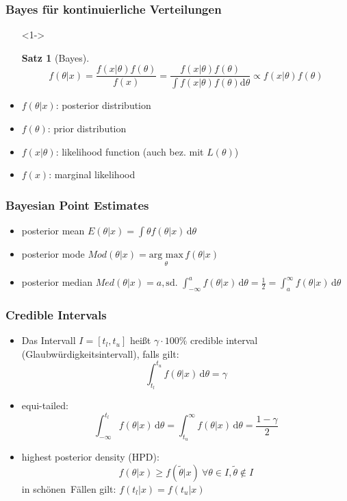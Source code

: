 \documentclass[aspectratio=169,xcolor=dvipsnames]{beamer}
\newtheorem{satz}{Satz}
\begin{document}
\begin{frame}
\frametitle{Bayes für kontinuierliche Verteilungen}
\begin{itemize}
\item[]<1-> \begin{satz}[Bayes]
$$f(\theta|x)=\frac{f(x|\theta)f(\theta)}{f(x)}=\frac{f(x|\theta)f(\theta)}{\int f(x|\theta)f(\theta)\text{d}\theta}\propto f(x|\theta)f(\theta)$$
\end{satz}
\item<2-> $f(\theta|x)$: posterior distribution
\item<2-> $f(\theta)$: prior distribution
\item<2-> $f(x|\theta)$: likelihood function (auch bez. mit $L(\theta)$)
\item<2-> $f(x)$: marginal likelihood
\end{itemize}
\end{frame}

\begin{frame}
\frametitle{Bayesian Point Estimates}
\begin{itemize}
\item<1-> posterior mean $E(\theta|x)=\int \theta f(\theta|x)\,\text{d}\theta$
\item<2-> posterior mode $Mod(\theta|x) = \underset{\theta}{\text{arg max}}\,f(\theta|x)$
\item<3-> posterior median $Med(\theta|x) = a, \text{sd. } \int_{-\infty}^{a}f(\theta|x)\,\text{d}\theta = \frac{1}{2} = \int_{a}^{\infty}f(\theta|x)\,\text{d}\theta$
\end{itemize}
\end{frame}

\begin{frame}
\frametitle{Credible Intervals}
\begin{itemize}
\item<1-> Das Intervall $I=[t_l,t_u]$ heißt $\gamma\cdot 100\%$ credible interval (Glaubwürdigkeitsintervall), falls gilt: $$\int_{t_l}^{t_u}f(\theta|x)\,\text{d}\theta = \gamma$$
\item<2-> equi-tailed: $$\int_{-\infty}^{t_l}f(\theta|x)\,\text{d}\theta = \int_{t_u}^{\infty}f(\theta|x)\,\text{d}\theta = \frac{1-\gamma}{2}$$
\item<3-> highest posterior density (HPD): $$f(\theta|x)\geq f(\tilde{\theta}|x)~\forall\theta\in I, \tilde{\theta}\notin I$$
in \glqq schönen\grqq~Fällen gilt: $f(t_l|x)=f(t_u|x)$
\end{itemize}
\end{frame}
\end{document}
